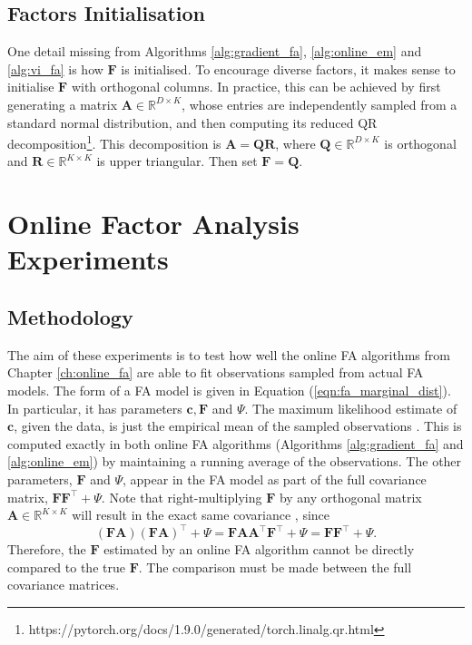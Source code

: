 \documentclass[msc,deptreport.inf]{infthesis} %
\newcommand{\matr}[1]{\mathbf{#1}}
\newcommand{\R}{\mathbb R}
\begin{document}
\section{Factors Initialisation}\label{sec:F_init}

One detail missing from Algorithms \ref{alg:gradient_fa}, \ref{alg:online_em} and \ref{alg:vi_fa} is how $\matr{F}$ is initialised. To encourage diverse factors, it makes sense to initialise $\matr{F}$ with orthogonal columns. In practice, this can be achieved by first generating a matrix $\matr{A}  \in \R^{D \times K}$, whose entries are independently sampled from a standard normal distribution, and then computing its reduced QR decomposition\footnote{https://pytorch.org/docs/1.9.0/generated/torch.linalg.qr.html}. This decomposition is $\matr{A} = \matr{Q}\matr{R}$, where $\matr{Q} \in \R^{D \times K}$ is orthogonal and $\matr{R} \in \R^{K \times K}$ is upper triangular. Then set $\matr{F} = \matr{Q}$.


\chapter{Online Factor Analysis Experiments}\label{ch:online_fa_experiments}


\section{Methodology}

The aim of these experiments is to test how well the online FA algorithms from Chapter \ref{ch:online_fa} are able to fit observations sampled from actual FA models. The form of a FA model is given in Equation (\ref{eqn:fa_marginal_dist}). In particular, it has parameters $\matr{c}, \matr{F}$ and $\Psi$. The maximum likelihood estimate of $\matr{c}$, given the data, is just the empirical mean of the sampled observations \cite{barber2007}. This is computed exactly in both online FA algorithms (Algorithms \ref{alg:gradient_fa} and \ref{alg:online_em}) by maintaining a running average of the observations. The other parameters, $\matr{F}$ and $\Psi$, appear in the FA model as part of the full covariance matrix,  $\matr{F}\matr{F}^\intercal + \Psi$. Note that right-multiplying $\matr{F}$ by any orthogonal matrix $\matr{A} \in \R^{K \times K}$ will result in the exact same covariance \cite{barber2007}, since
\begin{equation}
	(\matr{F} \matr{A}) (\matr{F} \matr{A})^\intercal + \Psi
	= \matr{F} \matr{A} \matr{A}^\intercal \matr{F}^\intercal + \Psi
	= \matr{F} \matr{F}^\intercal + \Psi.
\end{equation}
Therefore, the $\matr{F}$ estimated by an online FA algorithm cannot be directly compared to the true $\matr{F}$. The comparison must be made between the full covariance matrices.  
\end{document}
